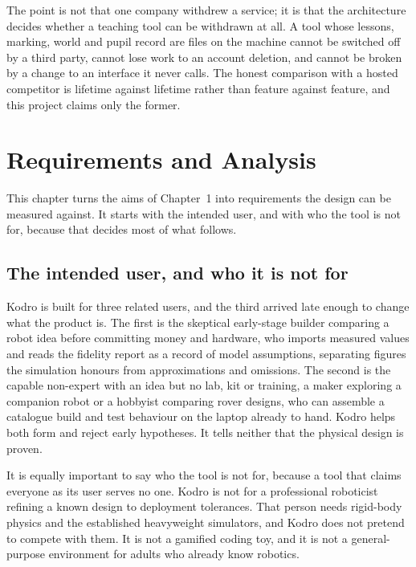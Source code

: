 \documentclass[11pt,a4paper]{report}
\begin{document}
The point is not that one company withdrew a service; it is that the architecture decides whether a teaching tool can be withdrawn at all. A tool whose lessons, marking, world and pupil record are files on the machine cannot be switched off by a third party, cannot lose work to an account deletion, and cannot be broken by a change to an interface it never calls. The honest comparison with a hosted competitor is lifetime against lifetime rather than feature against feature, and this project claims only the former.

\chapter{Requirements and Analysis}

 This chapter turns the aims of Chapter~1 into requirements the design can be measured against. It starts with the intended user, and with who the tool is not for, because that decides most of what follows.

\section{The intended user, and who it is not for}
\label{sec:users}
 Kodro is built for three related users, and the third arrived late enough to change what the product is. The first is the skeptical early-stage builder comparing a robot idea before committing money and hardware, who imports measured values and reads the fidelity report as a record of model assumptions, separating figures the simulation honours from approximations and omissions. The second is the capable non-expert with an idea but no lab, kit or training, a maker exploring a companion robot or a hobbyist comparing rover designs, who can assemble a catalogue build and test behaviour on the laptop already to hand. Kodro helps both form and reject early hypotheses. It tells neither that the physical design is proven.

 It is equally important to say who the tool is not for, because a tool that claims everyone as its user serves no one. Kodro is not for a professional roboticist refining a known design to deployment tolerances. That person needs rigid-body physics and the established heavyweight simulators, and Kodro does not pretend to compete with them. It is not a gamified coding toy, and it is not a general-purpose environment for adults who already know robotics.
\end{document}
